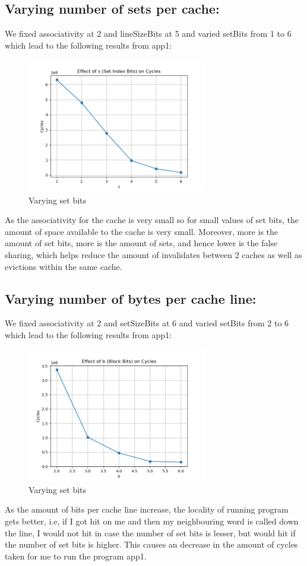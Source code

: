 \documentclass{article}
\begin{document}
\subsection{Varying number of sets per cache:}
We fixed associativity at 2 and lineSizeBits at 5 and varied setBits from 1 to 6 which lead to the following results from app1:
\begin{figure}[h]
  \centering
  \includegraphics[width=0.7\textwidth]{plot_vary_s.png}
  \caption{Varying set bits}
  \label{fig:arch}
\end{figure}
As the associativity for the cache is very small so for small values of set bits, the amount of space available to the cache is very small. Moreover, more is the amount of set bits, more is the amount of sets, and hence lower is the false sharing, which helps reduce the amount of invalidates between 2 caches as well as evictions within the same cache.

\subsection{Varying number of bytes per cache line:}
We fixed associativity at 2 and setSizeBits at 6 and varied setBits from 2 to 6 which lead to the following results from app1:
\begin{figure}[h]
  \centering
  \includegraphics[width=0.7\textwidth]{plot_vary_b.png}
  \caption{Varying set bits}
  \label{fig:arch}
\end{figure}
As the amount of bits per cache line increase, the locality of running program gets better, i.e, if I got hit on me and then my neighbouring word is called down the line, I would not hit in case the number of set bits is lesser, but would hit if the number of set bits is higher. This causes an decrease in the amount of cycles taken for me to run the program app1.
\end{document}
